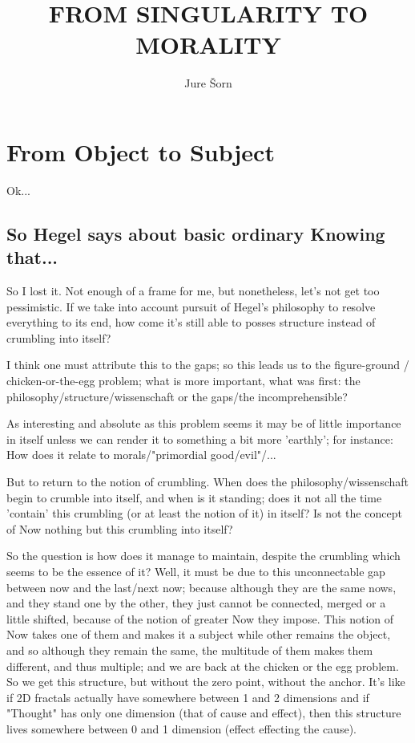 \documentclass[10pt]{book}
\begin{document}
\title{FROM SINGULARITY TO MORALITY}
\author{Jure \v Sorn}
\maketitle

\tableofcontents

\chapter {From Object to Subject}

Ok...

\section{So Hegel says about basic ordinary Knowing that...}

So I lost it. Not enough of a frame for me, but nonetheless, let's not get too pessimistic. If we take into account pursuit of Hegel's philosophy to resolve everything to its end, how come it's still able to posses structure instead of crumbling into itself?

I think one must attribute this to the gaps; so this leads us to the figure-ground / chicken-or-the-egg problem; what is more important, what was first: the philosophy/structure/wissenschaft or the gaps/the incomprehensible?

As interesting and absolute as this problem seems it may be of little importance in itself unless we can render it to something a bit more 'earthly'; for instance: How does it relate to morals/"primordial good/evil"/...

But to return to the notion of crumbling. When does the philosophy/wissenschaft begin to crumble into itself, and when is it standing; does it not all the time 'contain' this crumbling (or at least the notion of it) in itself? Is not the concept of Now nothing but this crumbling into itself?

So the question is how does it manage to maintain, despite the crumbling which seems to be the essence of it? Well, it must be due to this unconnectable gap between now and the last/next now; because although they are the same nows, and they stand one by the other, they just cannot be connected, merged or a little shifted, because of the notion of greater Now they impose. This notion of Now takes one of them and makes it a subject while other remains the object, and so although they remain the same, the multitude of them makes them different, and thus multiple; and we are back at the chicken or the egg problem. So we get this structure, but without the zero point, without the anchor. It's like if 2D fractals actually have somewhere between 1 and 2 dimensions and if "Thought" has only one dimension (that of cause and effect), then this structure lives somewhere between 0 and 1 dimension (effect effecting the cause). 
\end{document}
